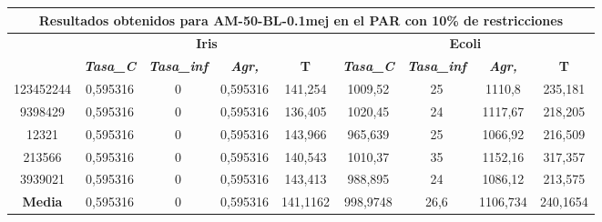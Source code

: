 \documentclass[12pt, spanish]{article}
\begin{document}
\begin{table}[H]
\footnotesize
\begin{tabular}{|c|c|c|c|c|c|c|c|c|}
\hline
\multicolumn{9}{|c|}{\textbf{Resultados obtenidos para AM-50-BL-0.1mej en el PAR con 10\% de restricciones}}                                                                                                      \\ \hline
\multirow{2}{*}{} & \multicolumn{4}{c|}{\textbf{Iris}}                                                            & \multicolumn{4}{c|}{\textbf{Ecoli}}                                                           \\ \cline{2-9} 
                  & \textit{\textbf{Tasa\_C}} & \textit{\textbf{Tasa\_inf}} & \textit{\textbf{Agr,}} & \textbf{T} & \textit{\textbf{Tasa\_C}} & \textit{\textbf{Tasa\_inf}} & \textit{\textbf{Agr,}} & \textbf{T} \\ \hline
123452244         & 0,595316                  & 0                           & 0,595316               & 141,254    & 1009,52                   & 25                          & 1110,8                 & 235,181    \\ \hline
9398429           & 0,595316                  & 0                           & 0,595316               & 136,405    & 1020,45                   & 24                          & 1117,67                & 218,205    \\ \hline
12321             & 0,595316                  & 0                           & 0,595316               & 143,966    & 965,639                   & 25                          & 1066,92                & 216,509    \\ \hline
213566            & 0,595316                  & 0                           & 0,595316               & 140,543    & 1010,37                   & 35                          & 1152,16                & 317,357    \\ \hline
3939021           & 0,595316                  & 0                           & 0,595316               & 143,413    & 988,895                   & 24                          & 1086,12                & 213,575    \\ \hline
\textbf{Media}    & 0,595316                  & 0                           & 0,595316               & 141,1162   & 998,9748                  & 26,6                        & 1106,734               & 240,1654   \\ \hline
\end{tabular}
\end{table}
\end{document}
